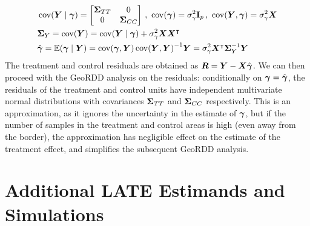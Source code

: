 \begin{equation}
    \begin{split}
        &
        \cov\del{\Yvec \mid \gammavec }
                = \begin{bmatrix}
                    \STT & 0 \\
                    0 & \SCC
                  \end{bmatrix}
            \,,\
            \cov\del{\gammavec} = \sigmabeta^2 \eye_p
            \,,\
            \cov\del{\Yvec, \gammavec} = \sigmabeta^2 \Xmat \\&
        \SigmaMat_Y = \cov\del{\Yvec}
            = \cov\del{\Yvec \mid \gammavec}
                + \sigmabeta^2 \Xmat \Xmat\trans \\&
        \hat\gammavec
            = \E\del{\gammavec \mid \Yvec}
            = \cov\del{\gammavec,\Yvec} \cov\del{\Yvec,\Yvec}^{-1} \Yvec
            = \sigmabeta^2 \Xmat\trans\SigmaMat_{Y}^{-1} \Yvec
    \end{split}
\end{equation}
The treatment and control residuals are obtained as \(\bm{R} = \bm{Y} - \bm{X} \hat{\bm{\gamma}}\).
We can then proceed with the GeoRDD analysis on the residuals:
conditionally on \(\bm{\gamma}=\hat{\bm{\gamma}}\), the residuals of the treatment and control units have independent multivariate normal distributions with covariances \(\bm{\Sigma}_{T T}\) and \(\bm{\Sigma}_{C C}\) respectively.
This is an approximation, as it ignores the uncertainty in the estimate of \(\bm{\gamma}\), but if the number of samples in the treatment and control areas is high (even away from the border), the approximation has negligible effect on the estimate of the treatment effect, and simplifies the subsequent GeoRDD analysis.

\section{Additional LATE Estimands and Simulations}
\label{sec:additional_late}

